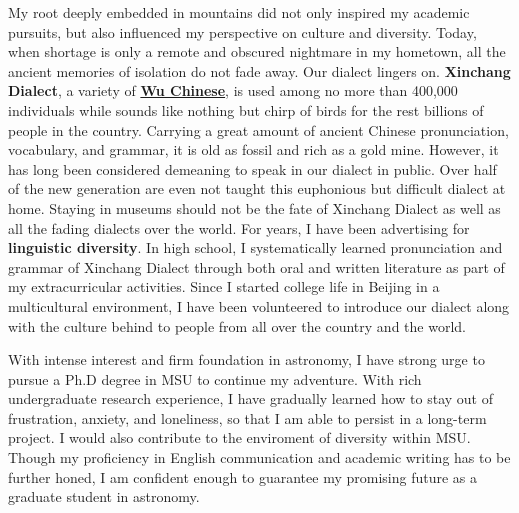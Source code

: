 \documentclass[11pt, a4paper]{awesome-cv} %
\begin{document}
\begin{cvletter}
My root deeply embedded in mountains did not only inspired my academic pursuits, but also influenced my perspective on culture and diversity. Today, when shortage is only a remote and obscured nightmare in my hometown, all the ancient memories of isolation do not fade away. Our dialect lingers on. \textbf{Xinchang Dialect}, a variety of \href{https://en.wikipedia.org/wiki/Wu_Chinese}{\textbf{Wu Chinese}}, is used among no more than 400,000 individuals while sounds like nothing but chirp of birds for the rest billions of people in the country. Carrying a great amount of ancient Chinese pronunciation, vocabulary, and grammar, it is old as fossil and rich as a gold mine. However, it has long been considered demeaning to speak in our dialect in public. Over half of the new generation are even not taught this euphonious but difficult dialect at home. Staying in museums should not be the fate of Xinchang Dialect as well as all the fading dialects over the world. For years, I have been advertising for \textbf{linguistic diversity}. In high school, I systematically learned pronunciation and grammar of Xinchang Dialect through both oral and written literature as part of my extracurricular activities. Since I started college life in Beijing in a multicultural environment, I have been volunteered to introduce our dialect along with the culture behind to people from all over the country and the world. 

With intense interest and firm foundation in astronomy, I have strong urge to pursue a Ph.D degree in MSU to continue my adventure. With rich undergraduate research experience, I have gradually learned how to stay out of frustration, anxiety, and loneliness, so that I am able to persist in a long-term project. I would also contribute to the enviroment of diversity within MSU. Though my proficiency in English communication and academic writing has to be further honed, I am confident enough to guarantee my promising future as a graduate student in astronomy.

\end{cvletter}


\end{document}
